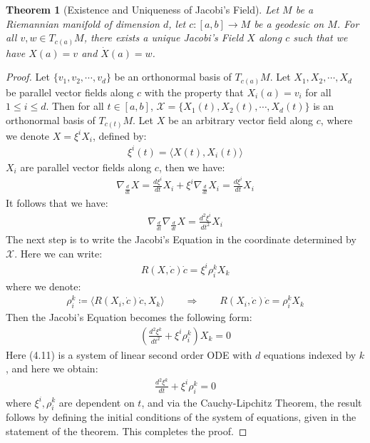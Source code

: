 \documentclass[11pt]{book}
\theoremstyle{break}
\theoremstyle{break}
\newtheorem{thm}{Theorem}[section]
\begin{document}
\begin{thm}[Existence and Uniqueness of Jacobi's Field]
Let $M$ be a Riemannian manifold of dimension $d$, let $c:[a,b] \to M$ be a geodesic on $M$. For all $v,w \in T_{c(a)}M$, there exists a unique Jacobi's Field $X$ along $c$ such that we have $X(a) = v$ and $\dot{X}(a) = w$.
\end{thm}
\begin{proof}
Let $\{v_1,v_2,\cdots, v_d\}$ be an orthonormal basis of $T_{c(a)}M$. Let $X_1, X_2,\cdots, X_d$ be parallel vector fields along $c$ with the property that $X_i(a) = v_i$ for all $1\leq i \leq d$. Then for all $t \in [a,b]$, $\mathcal{X} = \{X_1(t),X_2(t), \cdots, X_d(t)\}$ is an orthonormal basis of $T_{c(t)}M$. Let $X$ be an arbitrary vector field along $c$, where we denote $X = \xi^i X_i$, defined by:
\begin{align*}
\xi^i(t) = \langle X(t), X_i(t)\rangle
\end{align*}
$X_i$ are parallel vector fields along $c$, then we have:
\begin{align*}
\nabla_{\frac{d}{dt}}X = \frac{d\xi^i}{dt}X_i + \xi^i \nabla_{\frac{d}{dt}}X_i =  \frac{d\xi^i}{dt}X_i 
\end{align*}
It follows that we have:
\begin{align*}
\nabla_{\frac{d}{dt}}\nabla_{\frac{d}{dt}}X = \frac{d^2\xi^i}{dt^2}X_i
\end{align*}
The next step is to write the Jacobi's Equation in the coordinate determined by $\mathcal{X}$. Here we can write:
\begin{align*}
R(X,\dot{c}) \dot{c} = \xi^i \rho_i^k X_k
\end{align*}
where we denote:
\begin{align*}
\rho_i^k \coloneqq \langle R(X_i, \dot{c}) \dot{c}, X_k\rangle \qquad \Rightarrow\qquad R(X_i, \dot{c})\dot{c} = \rho_i^k X_k
\end{align*}
Then the Jacobi's Equation becomes the following form:
\begin{align}
\left( \frac{d^2\xi^k}{dt^2} + \xi^i \rho_{i}^k \right)X_k  = 0
\end{align}
Here (4.11) is a system of linear second order ODE with $d$ equations indexed by $k$, and here we obtain:
\begin{align*}
\frac{d^2 \xi^k}{dt} + \xi^i \rho_i^k = 0
\end{align*}
where $\xi^i,\rho_i^k$ are dependent on $t$, and via the Cauchy-Lipchitz Theorem, the result follows by defining the initial conditions of the system of equations, given in the statement of the theorem. This completes the proof. 
\end{proof}
\end{document}
